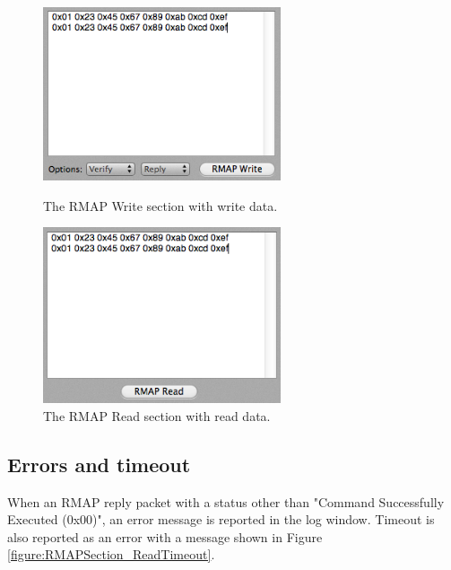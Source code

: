 \documentclass[a4paper,10pt]{article}
\begin{document}
\begin{figure}[htb]
\begin{center}
\begin{minipage}[t]{0.45\hsize}
\begin{center}
\includegraphics[width=7cm]{figures/SpaceWireRMAPGUI/RMAPSection_Write.png}
\vspace{-2mm}
\caption{The RMAP Write section with write data.}
\label{figure:RMAPSection_Write}
\end{center}
\end{minipage}
\hspace{0.05\hsize}
\begin{minipage}[t]{0.45\hsize}
\begin{center}
\includegraphics[width=7cm]{figures/SpaceWireRMAPGUI/RMAPSection_Read.png}
\vspace{-2mm}
\caption{The RMAP Read section with read data.}
\label{figure:RMAPSection_Read}
\end{center}
\end{minipage}
\end{center}
\end{figure}


\subsection{Errors and timeout}
When an RMAP reply packet with a status other than "Command Successfully Executed (0x00)", an error message is reported in the log window. Timeout is also reported as an error with a message shown in Figure \ref{figure:RMAPSection_ReadTimeout}. 
\end{document}
